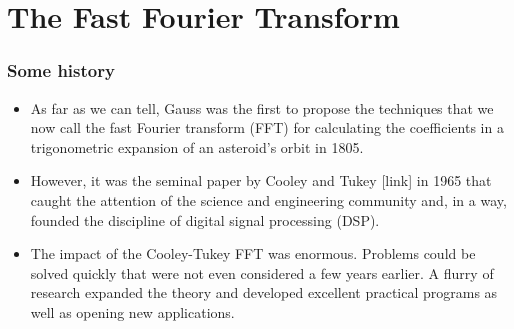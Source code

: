

\section{The Fast Fourier Transform}

\begin{frame}
\frametitle{Some history}
\begin{itemize}
\item As far as we can tell, Gauss was the first to propose the techniques that we now call the fast Fourier transform (FFT) for calculating the coefficients in a trigonometric expansion of an asteroid's orbit in 1805. 
\item However, it was the seminal paper by Cooley and Tukey [link] in 1965 that caught the attention of the science and engineering community and, in a way, founded the discipline of digital signal processing (DSP).
\item The impact of the Cooley-Tukey FFT was enormous. Problems could be solved quickly that were not even considered a few years earlier. A flurry of research expanded the theory and developed excellent practical programs as well as opening new applications.
\end{itemize}
\end{frame}


